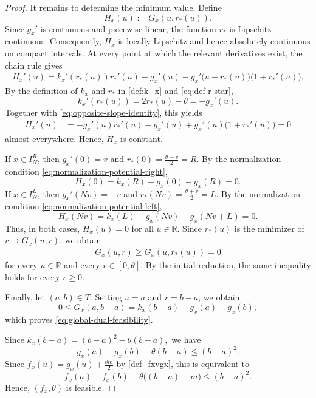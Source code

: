 \documentclass{article}
\begin{document}
\begin{proof}
It remains to determine the minimum value. Define
\[
    H_x(u)
    :=
    G_x(u,r_*(u)).
\]
Since \(g_x'\) is continuous and piecewise linear, the function
\(r_*\) is Lipschitz continuous. Consequently, \(H_x\) is locally
Lipschitz and hence absolutely continuous on compact intervals.
At every point at which the relevant derivatives exist, the chain
rule gives
\begin{align*}
    H_x'(u)
    =
    k_x'(r_*(u))r_*'(u)
    -
    g_x'(u)
    -
    g_x'\bigl(u+r_*(u)\bigr)
    \bigl(1+r_*'(u)\bigr).
\end{align*}
By the definition of \(k_x\) and \(r_*\) in \eqref{def:k_x} and \eqref{eq:def-r-star},
\[
    k_x'(r_*(u))
    =
    2r_*(u)-\theta
    =
    -g_x'(u).
\]
Together with \eqref{eq:opposite-slope-identity}, this yields
\begin{align*}
    H_x'(u)
    &=
    -g_x'(u)r_*'(u)
    -
    g_x'(u)
    +
    g_x'(u)\bigl(1+r_*'(u)\bigr)
    =0
\end{align*}
almost everywhere. Hence, \(H_x\) is constant.

If \(x\in I_N^R\), then
\(g_x'(0)=v\) and \(r_*(0)
    =
    \frac{\theta-v}{2}
    =
    R\).
By the normalization condition
\eqref{eq:normalization-potential-right},
\[H_x(0)
    =
    k_x(R)-g_x(0)-g_x(R)
    =
    0.
\]
If \(x\in I_N^L\), then
\(g_x'(Nv)=-v\) and \(r_*(Nv)
    =
    \frac{\theta+v}{2}
    =
    L\).
By the normalization condition
\eqref{eq:normalization-potential-left},
\[
    H_x(Nv)
    =
    k_x(L)-g_x(Nv)-g_x(Nv+L)
    =
    0.
\]
Thus, in both cases,
\(H_x(u)=0\) for all \(u\in\mathbb R\).
Since \(r_*(u)\) is the minimizer of \(r\mapsto G_x(u,r)\), we obtain
\begin{align}\label{eq:G-unique-zero}
    G_x(u,r)
    \geq
    G_x(u,r_*(u))
    =
    0
\end{align}
for every \(u\in\mathbb R\) and every \(r\in[0,\theta]\). By the
initial reduction, the same inequality holds for every \(r\geq0\).

Finally, let \((a,b)\in T\). Setting
\(u=a\) and \(r=b-a\),
we obtain
\[
    0
    \leq
    G_x(a,b-a)
    =
    k_x(b-a)-g_x(a)-g_x(b),
\]
which proves \eqref{eq:global-dual-feasibility}.

Since \(k_x(b-a)
    =
    (b-a)^2-\theta(b-a),
\)
we have
\[
    g_x(a)+g_x(b)+\theta(b-a)
    \leq
    (b-a)^2.
\]
Since \(f_x(u)=g_x(u)+\frac{\theta m}{2}\) by \eqref{def_fxvgx}, this is equivalent to
\[
    f_x(a)+f_x(b)
    +\theta\bigl((b-a)-m\bigr)
    \leq
    (b-a)^2.
\]
Hence, \((f_x,\theta)\) is feasible.
\end{proof}
\end{document}
